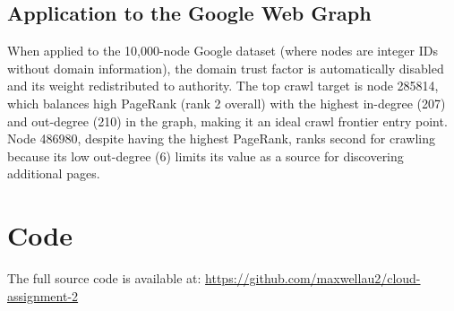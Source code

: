\documentclass{article}
\begin{document}
\subsection{Application to the Google Web Graph}

When applied to the 10,000-node Google dataset (where nodes are integer IDs without domain information), the domain trust factor is automatically disabled and its weight redistributed to authority. The top crawl target is node 285814, which balances high PageRank (rank 2 overall) with the highest in-degree (207) and out-degree (210) in the graph, making it an ideal crawl frontier entry point. Node 486980, despite having the highest PageRank, ranks second for crawling because its low out-degree (6) limits its value as a source for discovering additional pages.

\section{Code}
\label{sec:code}

The full source code is available at: \url{https://github.com/maxwellau2/cloud-assignment-2}
\end{document}
